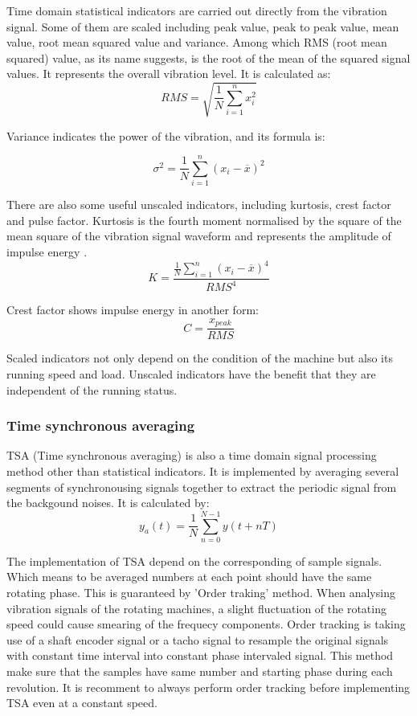 Time domain statistical indicators are carried out directly from the vibration signal. Some of them are scaled including peak value, peak to peak value, mean value, root mean squared value and variance.
Among which RMS (root mean squared) value, as its name suggests, is the root of the mean of the squared signal values. It represents the overall vibration level. It is calculated as:
\begin{equation}
	RMS = \sqrt{\frac{1}{N}\sum_{i=1}^n x_{i}^2}
\end{equation}

Variance indicates the power of the vibration, and its formula is:

\begin{equation}
	\sigma^2 = \frac{1}{N}\sum_{i=1}^n (x_{i} - \overline{x})^2
\end{equation}

There are also some useful unscaled indicators, including kurtosis, crest factor and pulse factor. Kurtosis is the fourth moment normalised by the square of the mean square of the vibration signal waveform and represents the amplitude of impulse energy \cite{trending}.
\begin{equation}
	K = \frac{\frac{1}{N}\sum_{i=1}^n (x_{i} - \overline{x})^4}{RMS^4}
\end{equation}

Crest factor shows impulse energy in another form:
\begin{equation}
	C = \frac{x_{peak}}{RMS}
\end{equation}

Scaled indicators not only depend on the condition of the machine but also its running speed and load. Unscaled indicators have the benefit that they are independent of the running status.

\subsubsection{Time synchronous averaging}

TSA (Time synchronous averaging) is also a time domain signal processing method other than statistical indicators. It is implemented by averaging several segments of synchronousing signals together to extract the periodic signal from the backgound noises. It is calculated by:
\begin{equation}
	y_{a}(t) = \frac{1}{N}\sum_{n=0}^{N-1} y(t+nT)
\end{equation}

The implementation of TSA depend on the corresponding of sample signals. Which means to be averaged numbers at each point should have the same rotating phase. This is guaranteed by 'Order traking' method. When analysing vibration signals of the rotating machines, a slight fluctuation of the rotating speed could cause smearing of the frequecy components. Order tracking is taking use of a shaft encoder signal or a tacho signal to resample the original signals with constant time interval into constant phase intervaled signal. This method make sure that the samples have same number and starting phase during each revolution. It is recomment to always perform order tracking before implementing TSA even at a constant speed.

